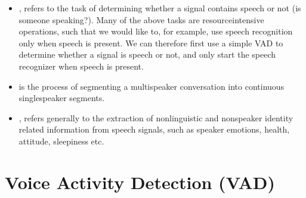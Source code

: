 \documentclass[letterpaper,10pt,english]{jupyterBook}
\begin{document}
\begin{itemize}
\item {} 
\sphinxAtStartPar
{\hyperref[\detokenize{Recognition/Voice_activity_detection::doc}]{}},
refers to the task of determining whether a signal contains speech
or not (is someone speaking?). Many of the above tasks are
resource\sphinxhyphen{}intensive operations, such that we would like to, for
example, use speech recognition only when speech is present. We can
therefore first use a simple VAD to determine whether a signal is
speech or not, and only start the speech recognizer when speech is
present.

\item {} 
\sphinxAtStartPar
{} is
the process of segmenting a multi\sphinxhyphen{}speaker conversation into
continuous single\sphinxhyphen{}speaker segments.

\item {} 
\sphinxAtStartPar
{},
refers generally to the extraction of non\sphinxhyphen{}linguistic and non\sphinxhyphen{}speaker
identity related information from speech signals, such as speaker
emotions, health, attitude, sleepiness etc.

\end{itemize}

\sphinxstepscope


\section{Voice Activity Detection (VAD)}
\label{\detokenize{Recognition/Voice_activity_detection:voice-activity-detection-vad}}\label{\detokenize{Recognition/Voice_activity_detection::doc}}
\end{document}
